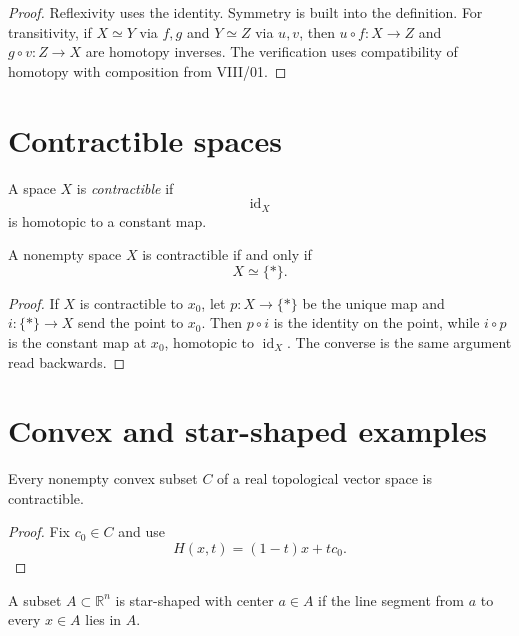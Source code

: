 \begin{proof}
Reflexivity uses the identity.  Symmetry is built into the definition.
For transitivity, if \(X\simeq Y\) via \(f,g\) and \(Y\simeq Z\) via \(u,v\),
then \(u\circ f:X\to Z\) and \(g\circ v:Z\to X\) are homotopy inverses.  The
verification uses compatibility of homotopy with composition from VIII/01.
\end{proof}

\section{Contractible spaces}

\begin{definition}
\label{def:viii02-contractible}
A space \(X\) is \emph{contractible} if
\[
\operatorname{id}_X
\]
is homotopic to a constant map.
\end{definition}

\begin{theorem}
\label{thm:viii02-point}
A nonempty space \(X\) is contractible if and only if
\[
X\simeq \{*\}.
\]
\end{theorem}

\begin{proof}
If \(X\) is contractible to \(x_0\), let \(p:X\to\{*\}\) be the unique map and
\(i:\{*\}\to X\) send the point to \(x_0\).  Then \(p\circ i\) is the identity
on the point, while \(i\circ p\) is the constant map at \(x_0\), homotopic to
\(\operatorname{id}_X\).  The converse is the same argument read backwards.
\end{proof}

\section{Convex and star-shaped examples}

\begin{proposition}
\label{prop:viii02-convex}
Every nonempty convex subset \(C\) of a real topological vector space is
contractible.
\end{proposition}

\begin{proof}
Fix \(c_0\in C\) and use
\[
H(x,t)=(1-t)x+tc_0.
\]
\end{proof}

\begin{definition}
\label{def:viii02-star}
A subset \(A\subset\mathbb R^n\) is star-shaped with center \(a\in A\) if the
line segment from \(a\) to every \(x\in A\) lies in \(A\).
\end{definition}

